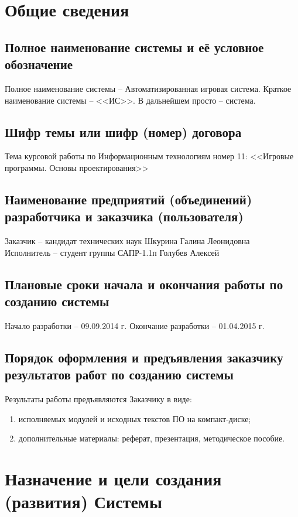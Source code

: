 \chapter{Общие сведения}
\section{Полное наименование системы и её условное обозначение}
Полное наименование системы -- Автоматизированная игровая система.
Краткое наименование системы -- <<ИС>>. В дальнейшем просто -- система.

\section{Шифр темы или шифр (номер) договора}
Тема курсовой работы по Информационным технологиям номер 11: 
<<Игровые программы. Основы проектирования>>

\section{Наименование предприятий (объединений) разработчика и заказчика (пользователя)}
Заказчик -- кандидат технических наук Шкурина Галина Леонидовна\\
Исполнитель -- студент группы САПР-1.1п Голубев Алексей

\section{Плановые сроки начала и окончания работы по созданию системы}
Начало разработки -- 09.09.2014 г. Окончание разработки -- 01.04.2015 г.

\section{Порядок оформления и предъявления заказчику результатов работ по созданию системы}
Результаты работы предъявляются Заказчику в виде:
\begin{enumerate}
    \item исполняемых модулей и исходных текстов ПО на компакт-диске;
    \item дополнительные материалы: реферат, презентация, методическое пособие.
\end{enumerate}

\chapter{Назначение и цели создания (развития) Системы}
